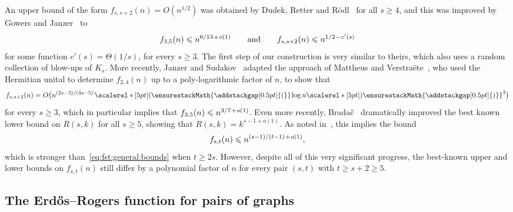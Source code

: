 \documentclass[12pt,reqno]{amsart}
\newcommand\pig[1]{\scalerel*[5pt]{\normalsize#1}{%
  \ensurestackMath{\addstackgap[0.5pt]{\normalsize#1}}}}
\newcommand\pigl[1]{\hspace{0.05cm}\mathopen{\pig{#1}}\hspace{0.03cm}}
\theoremstyle{remark}
\numberwithin{theorem}{section}
\renewcommand{\(}{\bigl(}
\renewcommand{\)}{\bigr)\vphantom{)}}
\newcommand{\p}{\hspace{0.02cm}+\hspace{0.02cm}}
\newcommand{\m}{\hspace{0.02cm}-\hspace{0.02cm}}
\renewcommand{\le}{\leqslant}
\renewcommand{\ge}{\geqslant}
\begin{document}
An upper bound of the form $f_{s,s+2}(n) = O(n^{1/2})$ was obtained by Dudek, Retter and R\"odl~\cite{DRR14} for all $s \ge 4$, and this was improved by Gowers and Janzer~\cite{GJ20} to 
$$f_{3,5}(n) \le n^{6/13 \p o(1)} \qquad \text{and} \qquad f_{s,s+2}(n) \le n^{1/2 \m c'(s)}$$
for some function $c'(s) = \Theta(1/s)$, for every $s \ge 3$. The first step of our construction is very similar to theirs, which also uses a random collection of blow-ups of $K_s$. More recently, Janzer and Sudakov~\cite{JS22} adapted the approach of Mattheus and Verstra\"ete~\cite{MaV}, who used the Hermitian unital to determine $f_{2,4}(n)$ up to a poly-logarithmic factor of $n$, to show that
$$f_{s,s+2}(n) = O\big( n^{(2s-3)/(4s-5)} \pigl( \log n \pig)^3 \big)$$
for every $s \ge 3$, which in particular implies that $f_{3,5}(n) \le n^{3/7 \p o(1)}$. Even more recently, Brada\v{c}~\cite{Br26} dramatically improved the best known lower bound on $R(s,k)$ for all $s \ge 5$, showing that $R(s,k) = k^{s - 1 + o(1)}$. As noted in~\cite[Section~4]{Br26}, this implies the bound 
$$f_{s,t}(n) \le n^{(s-1)/(t-1) \p o(1)},$$
which is stronger than~\eqref{eq:fst:general:bounds} when $t \ge 2s$.  However, despite all of this very significant progress, the best-known upper and lower bounds on $f_{s,t}(n)$ still differ by a polynomial factor of $n$ for every pair $(s,t)$ with $t \ge s + 2 \ge 5$. 


\pagebreak

\subsection{The Erd\H{o}s--Rogers function for pairs of graphs}
\end{document}
